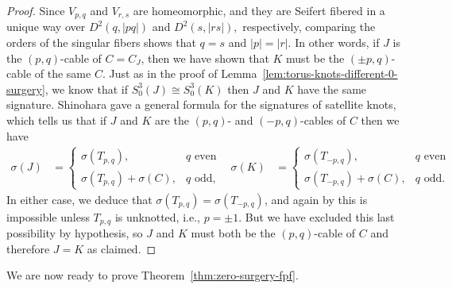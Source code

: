 \documentclass[11pt]{amsart}
\numberwithin{equation}{section}
\numberwithin{theorem}{section}
\theoremstyle{definition}
\begin{document}
\begin{proof}
Since $V_{p,q}$ and $V_{r,s}$ are homeomorphic, and they are Seifert fibered in a unique way over $D^2(q,|pq|)$ and $D^2(s,|rs|),$ respectively, comparing the orders of the singular fibers shows that $q=s$ and $|p|=|r|$.  In other words, if $J$ is the $(p,q)$-cable of $C=C_J$, then we have shown that  $K$ must be the $(\pm p,q)$-cable of the same $C$.  Just as in the proof of Lemma~\ref{lem:torus-knots-different-0-surgery}, we know that if $S^3_0(J) \cong S^3_0(K)$ then $J$ and $K$ have the same signature.  Shinohara \cite[Theorem~9]{shinohara} gave a general formula for the signatures of satellite knots, which tells us that if $J$ and $K$ are the $(p,q)$- and $(-p,q)$-cables of $C$ then we have
\begin{align*}
\sigma(J) &= \begin{cases} \sigma(T_{p,q}), & q \text{ even} \\ \sigma(T_{p,q}) + \sigma(C), & q \text{ odd}, \end{cases} &
\sigma(K) &= \begin{cases} \sigma(T_{-p,q}), & q \text{ even} \\ \sigma(T_{-p,q}) + \sigma(C), & q \text{ odd}. \end{cases}
\end{align*}
In either case, we deduce that $\sigma(T_{p,q}) = \sigma(T_{-p,q})$, and again by \cite{rudolph-signature} this is impossible unless $T_{p,q}$ is unknotted, i.e., $p=\pm 1$.  But we have excluded this last possibility by hypothesis, so $J$ and $K$ must both be the $(p,q)$-cable of $C$ and therefore $J=K$ as claimed.
\end{proof}

We are now ready to prove Theorem~\ref{thm:zero-surgery-fpf}.
\end{document}
